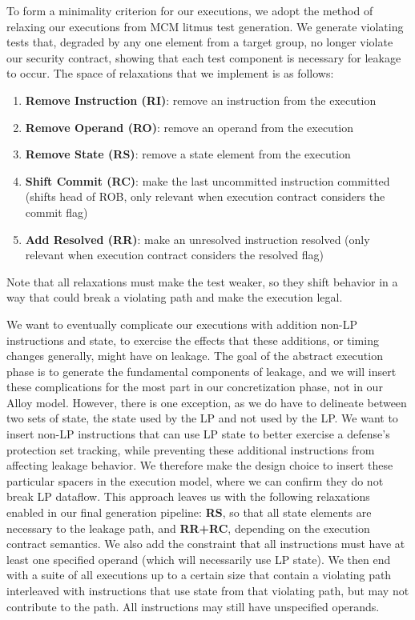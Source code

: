 
To form a minimality criterion for our executions, we adopt the method of relaxing our executions from MCM litmus test generation. We generate violating tests that, degraded by any one element from a target group, no longer violate our security contract, showing that each test component is necessary for leakage to occur. The space of relaxations that we implement is as follows:
\begin{enumerate}
    \item \textbf{Remove Instruction (RI)}: remove an instruction from the execution
    \item \textbf{Remove Operand (RO)}: remove an operand from the execution
    \item \textbf{Remove State (RS)}: remove a state element from the execution
    \item \textbf{Shift Commit (RC)}: make the last uncommitted instruction committed (shifts head of ROB, only relevant when execution contract considers the commit flag)
    \item \textbf{Add Resolved (RR)}: make an unresolved instruction resolved (only relevant when execution contract considers the resolved flag)
\end{enumerate}
Note that all relaxations must make the test weaker, so they shift behavior in a way that could break a violating path and make the execution legal.

We want to eventually complicate our executions with addition non-LP instructions and state, to exercise the effects that these additions, or timing changes generally, might have on leakage. The goal of the abstract execution phase is to generate the fundamental components of leakage, and we will insert these complications for the most part in our concretization phase, not in our Alloy model. However, there is one exception, as we do have to delineate between two sets of state, the state used by the LP and not used by the LP. We want to insert non-LP instructions that can use LP state to better exercise a defense's protection set tracking, while preventing these additional instructions from affecting leakage behavior. We therefore make the design choice to insert these particular spacers in the execution model, where we can confirm they do not break LP dataflow. This approach leaves us with the following relaxations enabled in our final generation pipeline: \textbf{RS}, so that all state elements are necessary to the leakage path, and \textbf{RR+RC}, depending on the execution contract semantics. We also add the constraint that all instructions must have at least one specified operand (which will necessarily use LP state). We then end with a suite of all executions up to a certain size that contain a violating path interleaved with instructions that use state from that violating path, but may not contribute to the path. All instructions may still have unspecified operands.

